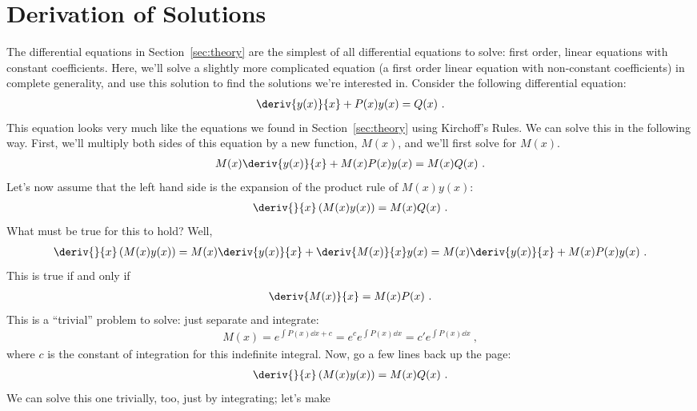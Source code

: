\documentclass[12pt]{article}
\begin{document}
\appendix

\section{Derivation of Solutions}
\label{sec:solutions}

The differential equations in Section~\ref{sec:theory} are the
simplest of all differential equations to solve: first order, linear
equations with constant coefficients.  Here, we'll solve a slightly
more complicated equation (a first order linear equation with
non-constant coefficients) in complete generality, and use this
solution to find the solutions we're interested in.  Consider the
following differential equation:
\begin{gather*}
  \deriv{y(x)}{x} + P(x) y(x) = Q(x)\ .
\end{gather*}
This equation looks very much like the equations we found in
Section~\ref{sec:theory} using Kirchoff's Rules.  We can solve this in
the following way.  First, we'll multiply both sides of this equation
by a new function, $M(x)$, and we'll first solve for $M(x)$.
\begin{gather*}
  M(x) \deriv{y(x)}{x} + M(x) P(x) y(x) = M(x) Q(x)\ .
\end{gather*}
Let's now assume that the left hand side is the expansion of the
product rule of $M(x) y(x)$:
\begin{gather*}
  \deriv{}{x} \left( M(x) y(x) \right) = M(x) Q(x)\ .
\end{gather*}
What must be true for this to hold?  Well,
\begin{gather*}
  \deriv{}{x} \left( M(x) y(x) \right) = 
  M(x) \deriv{y(x)}{x} + \deriv{M(x)}{x} y(x) = 
  M(x) \deriv{y(x)}{x} + M(x) P(x) y(x)\ .
\end{gather*}
This is true if and only if
\begin{gather*}
  \deriv{M(x)}{x} = M(x) P(x)\ .
\end{gather*}
This is a ``trivial'' problem to solve: just separate and integrate:
\begin{gather*}
  M(x) = e^{\int P(x) \dd x + c} = e^c e^{\int P(x) \dd x } = c' e^{\int P(x) \dd x}\ ,
\end{gather*}
where $c$ is the constant of integration for this indefinite integral.
Now, go a few lines back up the page:
\begin{gather*}
  \deriv{}{x} \left( M(x) y(x) \right) = M(x) Q(x)\ .
\end{gather*}
We can solve this one trivially, too, just by integrating; let's make
\end{document}

